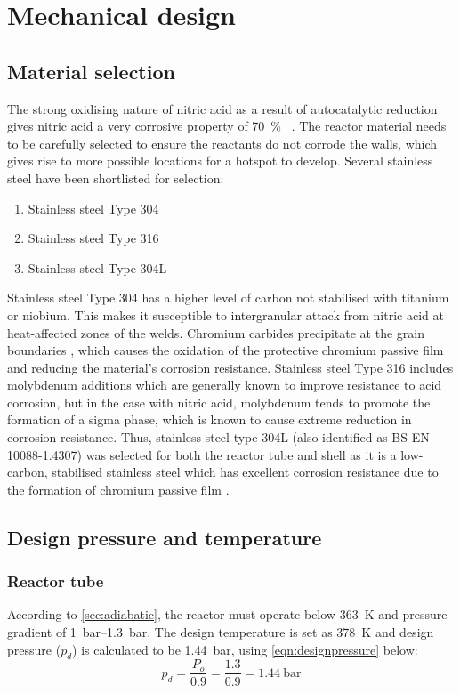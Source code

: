 \section{Mechanical design}
\subsection{Material selection}
The strong oxidising nature of nitric acid as a result of autocatalytic reduction gives nitric acid a very corrosive property of \SI{70}{\percent\wv} \cite{suresh_corrosion_nodate}. The reactor material needs to be carefully selected to ensure the reactants do not corrode the walls, which gives rise to more possible locations for a hotspot to develop. Several stainless steel have been shortlisted for selection: 
\begin{enumerate}
    \item Stainless steel Type 304
    \item Stainless steel Type 316
    \item Stainless steel Type 304L
\end{enumerate}

Stainless steel Type 304 has a higher level of carbon not stabilised with titanium or niobium. This makes it susceptible to intergranular attack from nitric acid at heat-affected zones of the welds. Chromium carbides precipitate at the grain boundaries \cite{cm_selection_nodate}, which causes the oxidation of the protective chromium passive film and reducing the material's corrosion resistance. Stainless steel Type 316 includes molybdenum additions which are generally known to improve resistance to acid corrosion, but in the case with nitric acid, molybdenum tends to promote the formation of a sigma phase, which is known to cause extreme reduction in corrosion resistance. Thus, stainless steel type 304L (also identified as BS EN 10088-1.4307) was selected for both the reactor tube and shell as it is a low-carbon, stabilised stainless steel which has excellent corrosion resistance due to the formation of chromium passive film \cite{ningshen_corrosion_2011}.

\subsection{Design pressure and temperature}
\subsubsection{Reactor tube}
According to \cref{sec:adiabatic}, the reactor must operate below \SI{363}{\K} and pressure gradient of \SIrange{1}{1.3}{\bar}. The design temperature is set as \SI{378}{\K} and design pressure ($p_d$) is calculated to be \SI{1.44}{\bar}, using \cref{eqn:designpressure} below:
\begin{equation}
    p_d = \frac{P_o}{0.9} = \frac{1.3}{0.9} = \SI{1.44}{\bar}
    \label{eqn:designpressure}
\end{equation}

